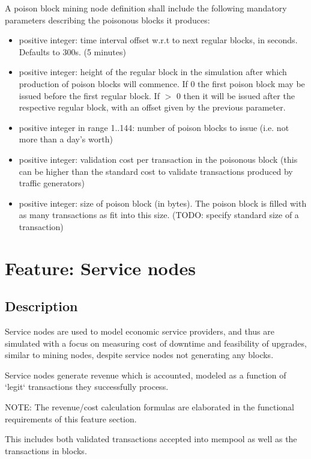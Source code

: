 \documentclass{scrreprt}
\begin{document}
A poison block mining node definition shall include the following mandatory
parameters describing the poisonous blocks it produces:

\begin{itemize}
   \item positive integer: time interval offset w.r.t to next regular blocks, in seconds. Defaults to 300s. (5 minutes)
   \item positive integer: height of the regular block in the simulation after which production of poison blocks will commence. If 0 the first poison block may be issued before the first regular block. If $>$ 0 then it will be issued after the respective regular block, with an offset given by the previous parameter.
   \item positive integer in range 1..144: number of poison blocks to issue (i.e. not more than a day's worth)
   \item positive integer: validation cost per transaction in the poisonous block (this can be higher than the standard cost to validate transactions produced by traffic generators)
   \item positive integer: size of poison block (in bytes). The poison block is filled with as many transactions as fit into this size. (TODO: specify standard size of a transaction)
\end{itemize}



\section{Feature: Service nodes}

\subsection{Description}

Service nodes are used to model economic service providers, and thus
are simulated with a focus on measuring cost of downtime and feasibility
of upgrades, similar to mining nodes, despite service nodes not generating
any blocks.

Service nodes generate revenue which is accounted, modeled as a function of
`legit` transactions they successfully process.

NOTE: The revenue/cost calculation formulas are elaborated in the functional
requirements of this feature section.

This includes both validated transactions accepted into mempool as well as
the transactions in blocks.
\end{document}
